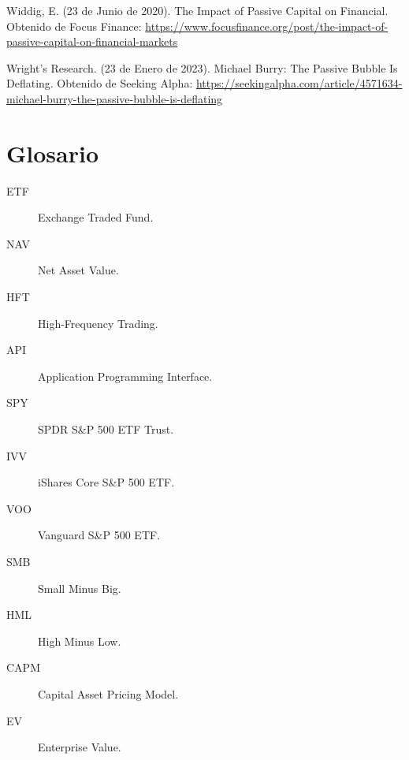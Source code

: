 \documentclass[12pt,a4paper]{article}
\begin{document}
\noindent
Widdig, E. (23 de Junio de 2020). The Impact of Passive Capital on Financial. Obtenido de Focus Finance: \url{https://www.focusfinance.org/post/the-impact-of-passive-capital-on-financial-markets}

\noindent
Wright's Research. (23 de Enero de 2023). Michael Burry: The Passive Bubble Is Deflating. Obtenido de Seeking Alpha: \url{https://seekingalpha.com/article/4571634-michael-burry-the-passive-bubble-is-deflating}

\newpage

\section{Glosario}

\begin{description}
\item[ETF] Exchange Traded Fund.
\item[NAV] Net Asset Value.
\item[HFT] High-Frequency Trading.
\item[API] Application Programming Interface.
\item[SPY] SPDR S\&P 500 ETF Trust.
\item[IVV] iShares Core S\&P 500 ETF.
\item[VOO] Vanguard S\&P 500 ETF.
\item[SMB] Small Minus Big.
\item[HML] High Minus Low.
\item[CAPM] Capital Asset Pricing Model.
\item[EV] Enterprise Value.
\end{description}
\end{document}
